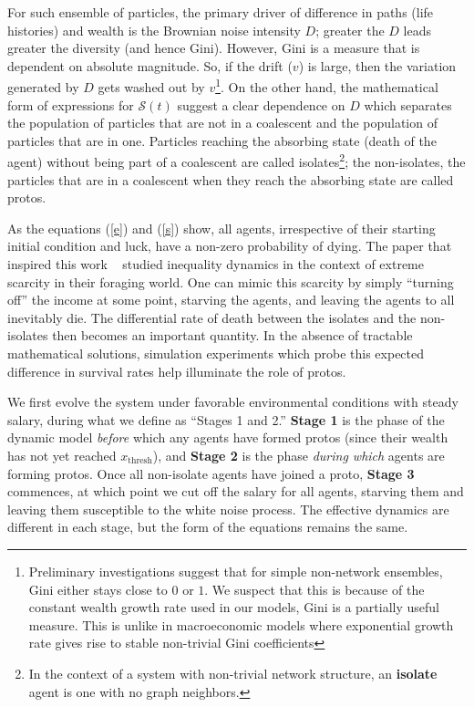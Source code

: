 For such ensemble of particles, the primary driver of difference in paths (life histories) and wealth is the Brownian noise intensity $D$; greater the $D$ leads greater the diversity (and hence Gini). However, Gini is a measure that is dependent on absolute magnitude. So, if the drift ($v$) is large, then the variation generated by
$D$ gets washed out by $v$\footnote{Preliminary investigations suggest that for simple non-network ensembles, Gini either stays close to $0$ or $1$. We suspect that this is because of the constant wealth growth rate used in our models, Gini is a partially useful measure. This is unlike in macroeconomic models where exponential growth rate gives rise to stable non-trivial Gini coefficients}. On the other hand, the mathematical form of expressions for $\mathcal{S}(t)$ suggest a clear dependence on $D$ which separates the population of particles that are not in a coalescent and the population of particles that are in one. Particles reaching the absorbing state (death of the agent) without being part of a coalescent are called isolates\footnote{In the context of a system with non-trivial network structure, an \textbf{isolate} agent is one with no graph neighbors.}; the non-isolates, the particles that are in a coalescent when they reach the absorbing state are called protos. 

As the equations (\ref{e}) and (\ref{s}) show, all agents, irrespective of their starting initial condition and luck, have a non-zero probability of dying. The paper that inspired this work ~\cite{srimil} studied inequality dynamics in the context of extreme scarcity in their foraging world. One can mimic this scarcity by simply ``turning off'' the income at some point, starving the agents, and leaving the agents to all inevitably die. The differential rate of death between the isolates and the non-isolates then becomes an important quantity. In the absence of tractable mathematical solutions, simulation experiments which probe this expected difference in survival rates help illuminate the role of protos. 

We first evolve the system under favorable environmental conditions with steady salary, during what we define as ``Stages 1 and 2.'' \textbf{Stage 1} is the phase of the dynamic model \textit{before} which any agents have formed protos (since their wealth has not yet reached $x_{\textrm{thresh}}$), and \textbf{Stage 2} is the phase \textit{during which} agents are forming protos. Once all non-isolate agents have joined a proto, \textbf{Stage 3} commences, at which point we cut off the salary for all agents, starving them and leaving them susceptible to the white noise process. The effective dynamics are different in each stage, but the form of the equations remains the same. 

